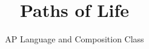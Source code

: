 \documentclass{tudelft-report}
\begin{document}
\frontmatter

\title[A Field Guide to Choosing a Career]{Paths of Life}
\author{AP Language and Composition Class}
\makecover



%

\tableofcontents

\mainmatter













\appendix



%
\end{document}
